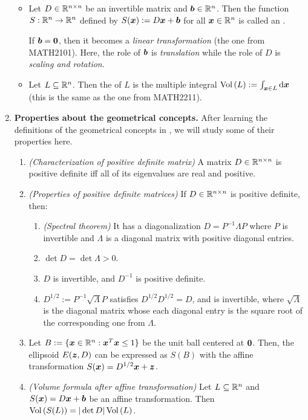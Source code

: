 \begin{enumerate}
\begin{itemize}
\item Let \(D\in\mathbb{R}^{n\times n}\) be an invertible matrix and
\(\bm{b}\in\mathbb{R}^n\). Then the function \(S:\mathbb{R}^n\to\mathbb{R}^n\) defined by
\(S(\bm{x}):=D\bm{x}+\bm{b}\) for all \(\bm{x}\in\mathbb{R}^n\) is called an
.
\begin{note}
If \(\bm{b}=\bm{0}\), then it becomes a \emph{linear transformation} (the
one from MATH2101). Here, the role of \(\bm{b}\) is \emph{translation} while
the role of \(D\) is \emph{scaling and rotation}.
\end{note}
\item Let \(L\subseteq \mathbb{R}^n\). Then the  of \(L\) is the multiple
integral \(\vol{L}:=\int_{\vect{x}\in L}^{}\odif{\vect{x}}\) (this is the same
as the one from MATH2211).
\end{itemize}
\item \label{it:ellip-method-geo-prop} \textbf{Properties about the
geometrical concepts.} After learning the definitions of the geometrical
concepts in , we will study some of
their properties here.
\begin{enumerate}
\item \emph{(Characterization of positive definite matrix)} A matrix
\(D\in\mathbb{R}^{n\times n}\) is positive definite iff all of its eigenvalues are
real and positive.
\item \emph{(Properties of positive definite matrices)} If \(D\in\mathbb{R}^{n\times
n}\) is positive definite, then:
\begin{enumerate}
\item \emph{(Spectral theorem)} It has a diagonalization \(D=P^{-1}\Lambda P\)
where \(P\) is invertible and \(\Lambda\) is a diagonal matrix with positive
diagonal entries.
\item \(\det{D}=\det{\Lambda}>0\).
\item \(D\) is invertible, and \(D^{-1}\) is positive definite.
\item \(D^{1/2}:=P^{-1}\sqrt{\Lambda}P\) satisfies \(D^{1/2}D^{1/2}=D\), and is
invertible, where \(\sqrt{\Lambda}\) is the diagonal matrix whose each diagonal
entry is the square root of the corresponding one from \(\Lambda\).
\end{enumerate}
\item Let \(B:=\{\bm{x}\in\mathbb{R}^n:\bm{x}^{T}\bm{x}\le 1\}\) be the unit
ball centered at \(\bm{0}\). Then, the ellipsoid \(E(\bm{z},D)\) can be
expressed as \(S(B)\) with the affine transformation
\(S(\bm{x})=D^{1/2}\bm{x}+\bm{z}\).
\item \emph{(Volume formula after affine transformation)} Let \(L\subseteq
\mathbb{R}^n\) and \(S(\bm{x})=D\bm{x}+\bm{b}\) be an affine transformation. Then
\(\operatorname{Vol}\left(S(L)\right)=|\det D|\operatorname{Vol}\left(L\right)\).


\end{enumerate}
\end{enumerate}
